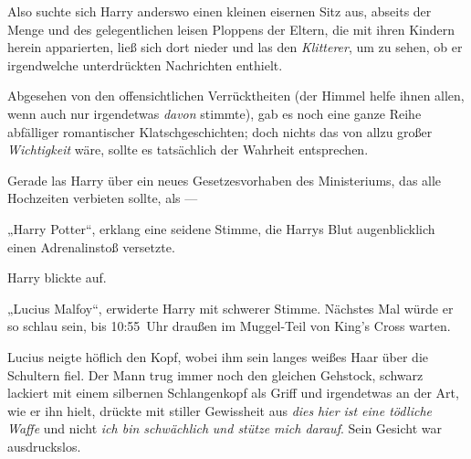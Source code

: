 Also suchte sich Harry anderswo einen kleinen eisernen Sitz aus, abseits der Menge und des gelegentlichen leisen Ploppens der Eltern, die mit ihren Kindern herein apparierten, ließ sich dort nieder und las den \emph{Klitterer}, um zu sehen, ob er irgendwelche unterdrückten Nachrichten enthielt.

Abgesehen von den offensichtlichen Verrücktheiten (der Himmel helfe ihnen allen, wenn auch nur irgendetwas \emph{davon} stimmte), gab es noch eine ganze Reihe abfälliger romantischer Klatschgeschichten; doch nichts das von allzu großer \emph{Wichtigkeit} wäre, sollte es tatsächlich der Wahrheit entsprechen.

Gerade las Harry über ein neues Gesetzesvorhaben des Ministeriums, das alle Hochzeiten verbieten sollte, als —

„Harry Potter“, erklang eine seidene Stimme, die Harrys Blut augenblicklich einen Adrenalinstoß versetzte.

Harry blickte auf.

„Lucius Malfoy“, erwiderte Harry mit schwerer Stimme. Nächstes Mal würde er so schlau sein, bis 10:55~Uhr draußen im Muggel-Teil von King’s Cross warten.

Lucius neigte höflich den Kopf, wobei ihm sein langes weißes Haar über die Schultern fiel. Der Mann trug immer noch den gleichen Gehstock, schwarz lackiert mit einem silbernen Schlangenkopf als Griff und irgendetwas an der Art, wie er ihn hielt, drückte mit stiller Gewissheit aus \emph{dies} \emph{hier} \emph{ist eine tödliche Waffe} und nicht \emph{ich bin schwächlich} \emph{und stütze mich darauf}. Sein Gesicht war ausdruckslos.

